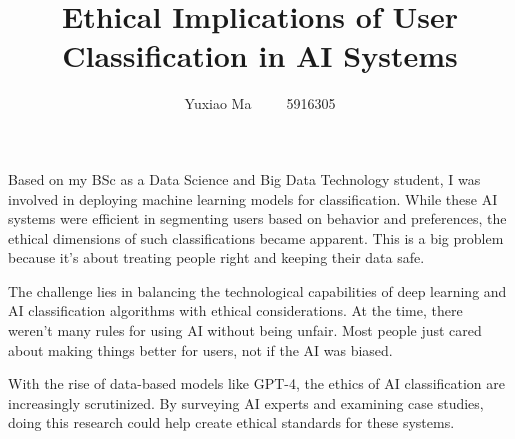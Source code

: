 \documentclass[UTF8,a4paper,AutoFakeBold,AutoFakeSlant]{article}
\title{\textbf{\textsf{{\textsf{Ethical Implications of User Classification in AI Systems}}}}}
\author{\tnewroman Yuxiao Ma~~~~~5916305}
\date{}
\begin{document}
\maketitle


Based on my BSc as a Data Science and Big Data Technology student, I was involved in deploying machine learning 
models for classification. While these AI systems were efficient in segmenting 
users based on behavior and preferences, the ethical dimensions of such classifications became apparent. 
This is a big problem because it's about treating people right and keeping their data safe.

The challenge lies in balancing the technological capabilities of deep learning and AI classification 
algorithms with ethical considerations. At the time, there weren't many rules for using AI without being unfair. 
Most people just cared about making things better for users, not if the AI was biased.

With the rise of data-based models like GPT-4, the ethics of AI classification are increasingly scrutinized. 
By surveying AI experts and examining case 
studies, doing this research could help create ethical standards for these systems. 



% 
% 
% 
\end{document}

